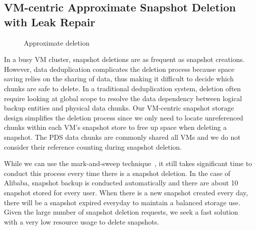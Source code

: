 %





\subsection{ VM-centric Approximate Snapshot Deletion with Leak Repair}

\begin{figure}[htbp]
  \centering
  \caption{Approximate deletion}
  \label{fig:deletion_flow}
\end{figure}

In a busy VM cluster, snapshot deletions are as frequent as snapshot creations.
However, data deduplication complicates the deletion process because space saving relies on the sharing of data,
thus making it difficult to decide which chunks are safe to delete.
In a traditional deduplication system, deletion often require looking at global scope to
resolve the data dependency between logical backup entities and physical data chunks.
Our VM-centric snapshot storage design simplifies the deletion process since 
we only need to locate unreferenced chunks within each VM's snapshot store to free up space when deleting a snapshot.
The PDS data chunks are commonly shared all VMs and we do not consider their reference
counting during snapshot deletion.

While we can use the mark-and-sweep technique~\cite{Guo2011}, 
it still takes significant time to conduct this process every time there is a snapshot deletion.
In the case of Alibaba, snapshot backup is conducted automatically and there are 
about 10 snapshot stored for every user. When there is
a new snapshot created every day,  there will be  a snapshot expired everyday to maintain
a balanced storage use. Given the large number of snapshot deletion requests, we seek
a fast solution with a very low resource usage to delete snapshots.

